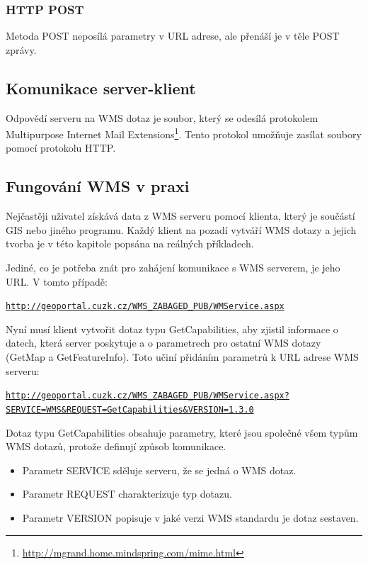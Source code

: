 \documentclass[a4paper,12pt]{article}
\begin{document}
\subsubsection{HTTP POST}

Metoda POST neposílá parametry v URL adrese, ale přenáší je v těle
POST zprávy.


\subsection{Komunikace server-klient}

Odpovědí serveru na WMS dotaz je soubor, který se odesílá protokolem
Multipurpose Internet Mail
Extensions\footnote{\url{http://mgrand.home.mindspring.com/mime.html}}. Tento
protokol umožňuje zasílat soubory pomocí protokolu HTTP.


\subsection{Fungování WMS v praxi}

 
Nejčastěji uživatel získává data z WMS serveru pomocí klienta, který
je součástí GIS nebo jiného programu. Každý klient na pozadí vytváří
WMS dotazy a jejich tvorba je v této kapitole popsána na reálných
příkladech.


\newpage
Jediné, co je potřeba znát pro zahájení komunikace s WMS serverem, je
jeho URL. V tomto případě:
\begin{alltt}\footnotesize
\url{http://geoportal.cuzk.cz/WMS_ZABAGED_PUB/WMService.aspx}
\end{alltt}

Nyní musí klient vytvořit dotaz typu GetCapabilities, aby zjistil
informace o datech, která server poskytuje a o parametrech pro ostatní
WMS dotazy (GetMap a GetFeatureInfo).  Toto učiní přidáním parametrů k
URL adrese WMS serveru:

\newcommand{\CUZKgetCap}{http://geoportal.cuzk.cz/WMS_ZABAGED_PUB/WMService.aspx?SERVICE=WMS&REQUEST=GetCapabilities&VERSION=1.3.0}
\begin{alltt}\footnotesize
\href{\CUZKgetCap}{http://geoportal.cuzk.cz/WMS_ZABAGED_PUB/WMService.aspx?}
\href{\CUZKgetCap}{SERVICE=WMS&REQUEST=GetCapabilities&VERSION=1.3.0}
\end{alltt}

 Dotaz typu GetCapabilities obsahuje parametry, které jsou společné
 všem typům WMS dotazů, protože definují způsob komunikace.
\begin{itemize}
  \item Parametr SERVICE sděluje serveru, že se jedná o WMS dotaz. 
  \item Parametr REQUEST charakterizuje typ dotazu. 
  \item Parametr VERSION popisuje v jaké verzi WMS standardu je dotaz sestaven.
\end{itemize}
\end{document}
